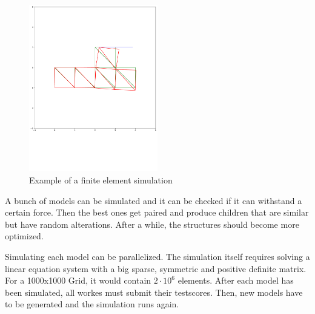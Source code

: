 \documentclass[12pt]{article}
\begin{document}
\begin{figure}[h]
    \centering
    \includegraphics[width=0.5\textwidth]{images/finiteElements.pdf}
    \caption{Example of a finite element simulation}
    \label{fig:finiteElements}
\end{figure}

A bunch of models can be simulated and it can be checked if it can withstand a certain force. Then the best ones get paired and produce children that are similar but have random alterations. After a while, the structures should become more optimized.

Simulating each model can be parallelized. The simulation itself requires solving a linear equation system with a big sparse, symmetric and positive definite matrix. For a 1000x1000 Grid, it would contain $2\cdot 10^6$ elements. After each model has been simulated, all workes must submit their testscores. Then, new models have to be generated and the simulation runs again.




\end{document}
